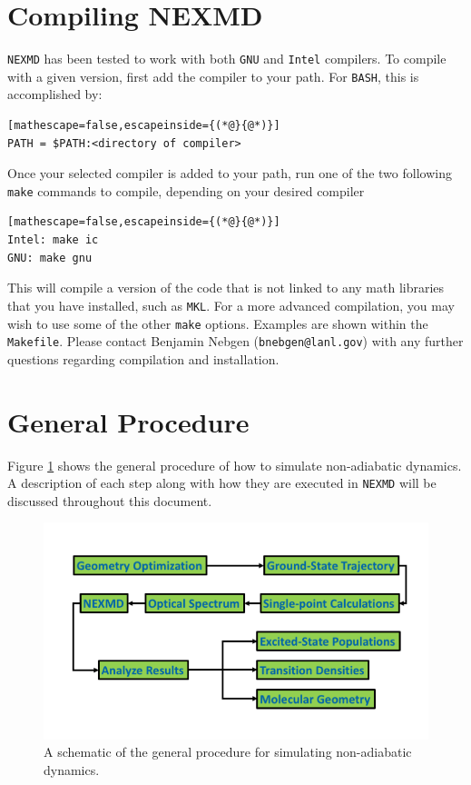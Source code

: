 \documentclass[letterpaper,12pt,titlepage]{article}
\begin{document}
\newpage
\section{Compiling NEXMD}

\verb+NEXMD+ has been tested to work with both \verb+GNU+ and \verb+Intel+ compilers. To compile with a given version, first add the compiler to your path. For \verb+BASH+, this is accomplished by:
\begin{lstlisting}[mathescape=false,escapeinside={(*@}{@*)}]
PATH = $PATH:<directory of compiler>
\end{lstlisting}
Once your selected compiler is added to your path, run one of the two following \verb+make+ commands to compile, depending on your desired compiler
\begin{lstlisting}[mathescape=false,escapeinside={(*@}{@*)}]
Intel: make ic
GNU: make gnu
\end{lstlisting}
This will compile a version of the code that is not linked to any math libraries that you have installed, such as \verb+MKL+. For a more advanced compilation, you may wish to use some of the other \verb+make+ options.  Examples are shown within the \verb+Makefile+. Please contact Benjamin Nebgen (\verb+bnebgen@lanl.gov+) with any further questions regarding compilation and installation.

\section{General Procedure}

Figure \ref{genproc} shows the general procedure of how to simulate non-adiabatic dynamics.  A description of each step along with how they are executed in \verb+NEXMD+ will be discussed throughout this document.
\begin{figure}[h]
	\centering
	\includegraphics[scale=.6]{general_procedure.png}
	\caption{\small A schematic of the general procedure for simulating non-adiabatic dynamics.}
\label{genproc}
\end{figure}
\end{document}
